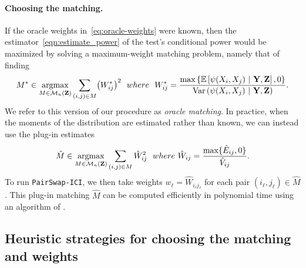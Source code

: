 \documentclass[12pt]{article}
\newcommand{\EEst}[2]{\mathbb{E}\left[{#1}\  \middle| \ {#2}\right]}
\newcommand{\VVst}[2]{\mathrm{Var}\left({#1}\  \middle| \ {#2}\right)}
\DeclareMathOperator*{\argmax}{argmax}
\newcommand{\bY}{\mathbf{Y}}
\newcommand{\bZ}{\mathbf{Z}}
\begin{document}
\paragraph{Choosing the matching.}
 If the oracle weights in~\eqref{eq:oracle-weights} were known, then the estimator~\eqref{eqn:estimate_power} of the test's conditional power
would be maximized by solving a maximum-weight matching problem, namely that of finding 
\begin{align}\label{def:oracle-matching}
        M^* \in \argmax_{M \in \mathcal{M}_n(\bZ)}\sum_{(i,j)\in M} \bigl(W_{ij}^*\bigr)^2 \ \ \textnormal{where}\ \  
    W_{ij}^* = \frac{\max\left\{\EEst{\psi(X_i,X_j)}{\bY,\bZ},0\right\}}{\VVst{\psi(X_i,X_j)}{\bY,\bZ}}.
\end{align}
We refer to this version of our procedure as \emph{oracle matching}.
In practice, when the moments of the distribution are estimated rather than known, we can instead use the plug-in estimates 
\begin{align}\label{def:plug-in-matching}
        \hat{M} \in \argmax_{M \in \mathcal{M}_n(\bZ)} \sum_{(i,j)\in M} \hat{W}_{ij}^2\ \ \textnormal{where} \  \hat{W}_{ij} = \frac{\max\{\hat{E}_{ij}, 0\}}{\hat{V}_{ij}}.
\end{align}
To run \textnormal{\texttt{PairSwap-ICI}}, we then take weights $w_\ell = \hat{W}_{i_\ell j_\ell}$ for each pair $(i_\ell,j_\ell) \in \hat{M}$.
This plug-in matching $\hat{M}$ can be computed efficiently in polynomial time \citep{edmonds1965paths, duan2014linear} using an algorithm of \cite{gabow1985scaling}.



\subsection{Heuristic strategies for choosing the matching and weights}\label{sec:heuristic matching}
\end{document}
